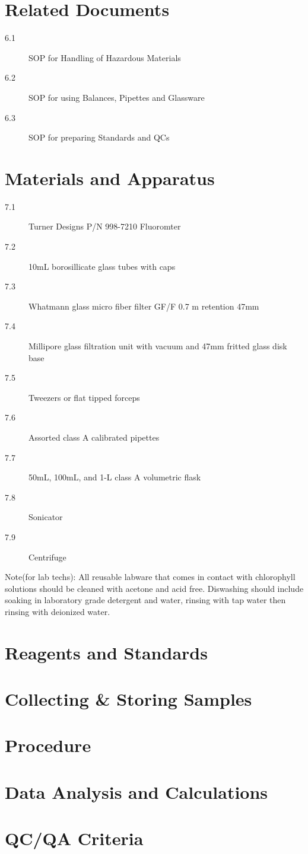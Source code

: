 \documentclass[12pt]{../SOP2}
\begin{document}
\section{Related Documents}
\begin{description}
\item[6.1] SOP for Handling of Hazardous Materials
\item[6.2] SOP for using Balances, Pipettes and Glassware
\item[6.3] SOP for preparing Standards and QCs %
\end{description}

\section{Materials and Apparatus}
\begin{description}
\item[7.1] Turner Designs P/N 998-7210 Fluoromter
\item[7.2] 10mL borosillicate glass tubes with caps
\item[7.3] Whatmann glass micro fiber filter GF/F 0.7 \micro m retention 47mm
\item[7.4] Millipore glass filtration unit with vacuum and 47mm fritted glass disk base
\item[7.5] Tweezers or flat tipped forceps
\item[7.6] Assorted class A calibrated pipettes
\item[7.7] 50mL, 100mL, and 1-L class A volumetric flask
\item[7.8] Sonicator %
\item[7.9] Centrifuge %
\end{description}

Note(for lab techs): All reusable labware that comes in contact with chlorophyll solutions should be cleaned with acetone and acid free. Diswashing should include soaking in laboratory grade detergent and water, rinsing with tap water then rinsing with deionized water. 

\section{Reagents and Standards}
\section{Collecting \& Storing Samples}
\section{Procedure}
\section{Data Analysis and Calculations}
\section{QC/QA Criteria}
\end{document}
